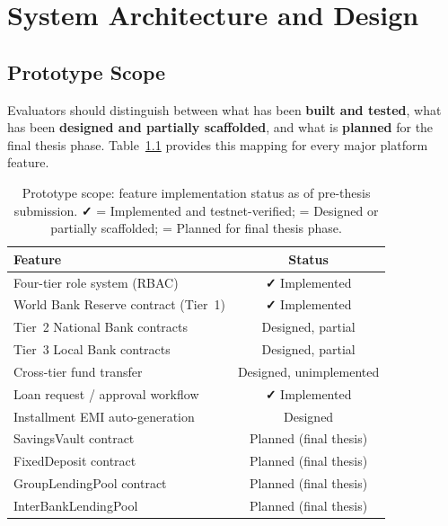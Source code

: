 \documentclass[12pt,a4paper]{report}
\newcommand{\tmarkDone}{\textbf{\faCheck}}
\newcommand{\tmarkPartial}{\faHourglassHalf}
\newcommand{\tmarkPlanned}{\textcolor{black!55}{\faCircle}}
\newcommand{\tableheadcolor}{\rowcolor{black!8}}
\newcommand{\tableheadfont}{\bfseries\small}
\begin{document}
\chapter{System Architecture and Design}

\section{Prototype Scope}
\label{sec:prototype-scope}

Evaluators should distinguish between what has been \textbf{built and tested}, what has been \textbf{designed and partially scaffolded}, and what is \textbf{planned} for the final thesis phase. Table~\ref{tab:prototype-scope} provides this mapping for every major platform feature.

\begin{table}[H]
\centering
\caption{Prototype scope: feature implementation status as of pre-thesis submission. \tmarkDone{} = Implemented and testnet-verified; \tmarkPartial{} = Designed or partially scaffolded; \tmarkPlanned{} = Planned for final thesis phase.}
\label{tab:prototype-scope}
\renewcommand{\arraystretch}{1.3}
\small
\begin{tabular}{@{}p{7.5cm}c@{}}
\toprule
\tableheadcolor
\tableheadfont Feature & \tableheadfont Status \\
\midrule
Four-tier role system (RBAC) & \tmarkDone{} Implemented \\
\rowcolor{RowShade}
World Bank Reserve contract (Tier~1) & \tmarkDone{} Implemented \\
Tier~2 National Bank contracts & \tmarkPartial{} Designed, partial \\
\rowcolor{RowShade}
Tier~3 Local Bank contracts & \tmarkPartial{} Designed, partial \\
Cross-tier fund transfer & \tmarkPartial{} Designed, unimplemented \\
\rowcolor{RowShade}
Loan request / approval workflow & \tmarkDone{} Implemented \\
Installment EMI auto-generation & \tmarkPartial{} Designed \\
\rowcolor{RowShade}
SavingsVault contract & \tmarkPlanned{} Planned (final thesis) \\
FixedDeposit contract & \tmarkPlanned{} Planned (final thesis) \\
\rowcolor{RowShade}
GroupLendingPool contract & \tmarkPlanned{} Planned (final thesis) \\
InterBankLendingPool & \tmarkPlanned{} Planned (final thesis) \\

\end{tabular}
\end{table}
\end{document}
